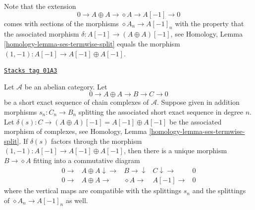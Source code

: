 Note that the extension
$$
0 \to
A \oplus A \to
\diamond A \to
A[-1] \to
0
$$
comes with sections of the morphisms $\diamond A_n \to A[-1]_n$
with the property that the associated morphism
$\delta : A[-1] \to (A \oplus A)[-1]$, see
Homology, Lemma \ref{homology-lemma-ses-termwise-split}
equals the morphism $(1, -1) : A[-1] \to A[-1] \oplus A[-1]$.

\begin{lemma}
\label{simplicial-lemma-map-into-diamond}
\href{https://stacks.math.columbia.edu/tag/01A3}{\texttt{Stacks tag 01A3}}

Let $\mathcal{A}$ be an abelian category.
Let
$$
0 \to A \oplus A \to B \to C \to 0
$$
be a short exact sequence of chain complexes of $\mathcal{A}$.
Suppose given in addition morphisms $s_n : C_n \to B_n$
splitting the associated short exact sequence in degree $n$.
Let $\delta(s) : C \to (A \oplus A)[-1] = A[-1] \oplus A[-1]$
be the associated morphism of complexes, see
Homology, Lemma \ref{homology-lemma-ses-termwise-split}.
If $\delta(s)$ factors through the morphism
$(1, -1) : A[-1] \to A[-1] \oplus A[-1]$, then
there is a unique morphism $B \to \diamond A$
fitting into a commutative diagram
$$
\begin{array}{ccccc}0 \longrightarrow & A \oplus A \downarrow\longrightarrow & B \longrightarrow\downarrow & C \downarrow\longrightarrow & 0 \\ 0 \longrightarrow & A \oplus A \longrightarrow & \diamond A \longrightarrow & A[-1] \longrightarrow & 0\end{array}
$$
where the vertical maps are compatible with the splittings
$s_n$ and the splittings of $\diamond A_n \to A[-1]_n$
as well.
\end{lemma}

